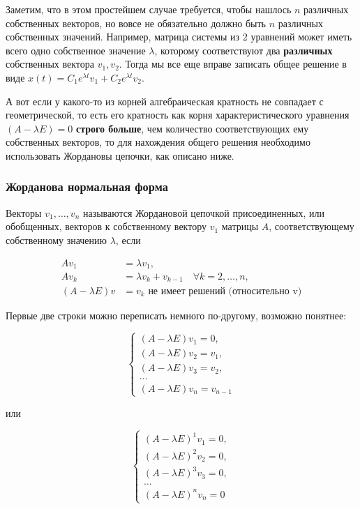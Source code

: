\Note Заметим, что в этом простейшем случае требуется, чтобы нашлось $n$ различных собственных векторов, но вовсе не обязательно должно быть $n$ различных собственных значений.
Например, матрица системы из 2 уравнений может иметь всего одно собственное значение $\lambda$, которому соответствуют два \textbf{различных} собственных вектора $v_1, v_2$.
Тогда мы все еще вправе записать общее решение в виде $x(t) = C_1 e^{\lambda t} v_1 + C_2 e^{\lambda t} v_2$.

А вот если у какого-то из корней алгебраическая кратность не совпадает с геометрической, то есть его кратность как корня характеристического уравнения $(A - \lambda E) = 0$ \textbf{строго больше}, чем количество соответствующих ему собственных векторов, то для нахождения общего решения необходимо использовать Жордановы цепочки, как описано ниже.

\subsubsection{Жорданова нормальная форма}

\Def Векторы $v_1, \dots, v_n$ называются Жордановой цепочкой присоединенных, или обобщенных, векторов к собственному вектору $v_1$ матрицы $A$, соответствующему собственному значению $\lambda$, если

\begin{align*}
    Av_1 &= \lambda v_1, \\
    Av_k &= \lambda v_k + v_{k-1} \quad \forall k = 2, \dots, n, \\
    (A - \lambda E) v &= v_k \text{ не имеет решений (относительно v)}
\end{align*}

\Note Первые две строки можно переписать немного по-другому, возможно понятнее:

\begin{equation*}
    \begin{cases}
        (A - \lambda E) v_1 = 0, \\
        (A - \lambda E) v_2 = v_1, \\
        (A - \lambda E) v_3 = v_2, \\
        \dots \\
        (A - \lambda E) v_n = v_{n-1}
    \end{cases}
\end{equation*}

или

\begin{equation*}
    \begin{cases}
    (A - \lambda E)^1 v_1 = 0, \\
    (A - \lambda E)^2 v_2 = 0, \\
    (A - \lambda E)^3 v_3 = 0, \\
    \dots \\
    (A - \lambda E)^n v_n = 0
    \end{cases}
\end{equation*}


